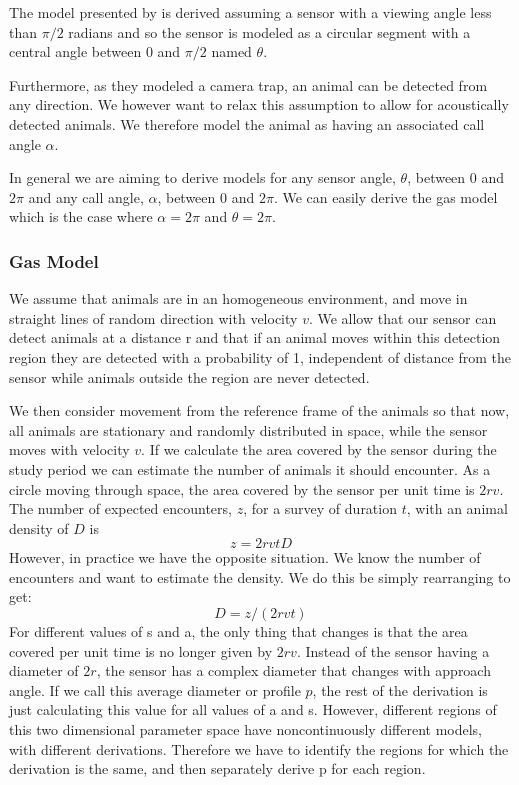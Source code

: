 \documentclass[a4paper,10pt,reqno,oneside]{amsart}
\begin{document}
The model presented by \citep{rowcliffe2008estimating} is derived assuming a sensor with a viewing angle less than $\pi/2$ radians and so the sensor is modeled as a circular segment with a central angle between 0 and  $\pi/2$ named  $\theta$.

Furthermore, as they modeled a camera trap, an animal can be detected from any direction. We however want to relax this assumption to allow for acoustically detected animals. We therefore model the animal as having an associated call angle $\alpha$.

In general we are aiming to derive models for any sensor angle, $ \theta$, between 0 and $2\pi$ and any call angle, $ \alpha$, between 0 and $2\pi$. We can easily derive the gas model which is the case where $ \alpha =  2\pi$ and $ \theta =  2\pi$.

\subsubsection{Gas Model}

We assume that animals are in an homogeneous environment, and move in straight lines of random direction with velocity $v$. We allow that our sensor can detect animals at a distance r and that if an animal moves within this detection region they are detected with a probability of 1, independent of distance from the sensor while animals outside the region are never detected.

We then consider movement from the reference frame of the animals so that now, all animals are stationary and randomly distributed in space, while the sensor moves with velocity $v$. If we calculate the area covered by the sensor during the study period we can estimate the number of animals it should encounter. As a circle moving through space, the area covered by the sensor per unit time is $2rv$. The number of expected encounters, $z$, for a survey of duration $t$, with an animal density of $D$ is
\begin{equation}
	z = 2rvtD
\end{equation}
However, in practice we have the opposite situation. We know the number of encounters and want to estimate the density. We do this be simply rearranging to get:
\begin{equation}
	D = z/(2rvt)
\end{equation}
For different values of s and a, the only thing that changes is that the area covered per unit time is no longer given by $2rv$. Instead of the sensor having a diameter of $2r$, the sensor has a complex diameter that changes with approach angle. If we call this average diameter or profile $p$, the rest of the derivation is just calculating this value for all values of a and s. However, different regions of this two dimensional parameter space have noncontinuously different models, with different derivations. Therefore we have to identify the regions for which the derivation is the same, and then separately derive p for each region.
\end{document}
